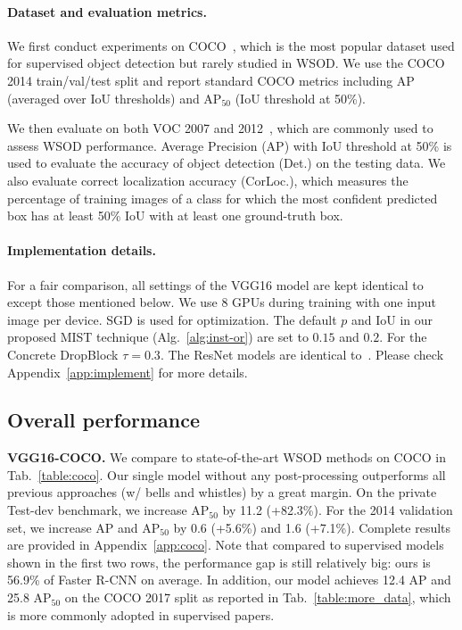 \documentclass[10pt,twocolumn,letterpaper]{article}
\begin{document}
\vspace{-1em}
\paragraph{\textbf{Dataset and evaluation metrics.} }
We first conduct experiments on COCO~\cite{coco}, which is the most popular dataset used for supervised object detection but rarely studied in WSOD. We use the COCO 2014 train/val/test split and report standard COCO metrics including AP (averaged over IoU thresholds) and AP$_{50}$ (IoU threshold at 50\%).  

We then evaluate on both VOC 2007 and 2012~\cite{pascal}, which are commonly used to assess WSOD performance. Average Precision (AP) with IoU threshold at 50\% is used to evaluate the accuracy of object detection (Det.) on the testing data. We also evaluate correct localization accuracy (CorLoc.), which measures the percentage of training images of a class for which the most confident predicted box has at least 50\% IoU with at least one ground-truth box.

\vspace{-1em}
\paragraph{\textbf{Implementation details.} }
For a fair comparison, all  settings of the VGG16 model are kept identical to~\cite{tang2017multiple, tang2018pcl} except those mentioned below. We use 8 GPUs during training with one input image per device. SGD is used for optimization. The default $p$ and IoU in our proposed MIST technique (Alg.~\ref{alg:inst-or}) are set to $0.15$ and $0.2$. For the Concrete DropBlock $\tau = 0.3$. The ResNet models are  identical to~\cite{fastrcnn}. Please check Appendix~\ref{app:implement} for more  details.

\subsection{Overall performance}

\noindent\textbf{VGG16-COCO.}
We compare to state-of-the-art WSOD methods on COCO in Tab.~\ref{table:coco}. Our single model without any post-processing outperforms all previous approaches (w/ bells and whistles) by a great margin. On the private Test-dev benchmark, we increase  AP$_{50}$ by 11.2 (+82.3\%). For the 2014 validation set, we increase  AP and AP$_{50}$ by 0.6 (+5.6\%) and 1.6 (+7.1\%). Complete results are provided in Appendix~\ref{app:coco}.  Note that compared to  supervised models  shown in the first two rows, the performance gap is still relatively big: ours is 56.9\% of Faster R-CNN on average. In addition, our model achieves 12.4 AP and 25.8 AP$_{50}$ on the COCO 2017 split as reported in Tab.~\ref{table:more_data}, which is more commonly adopted in supervised papers. 
\end{document}
